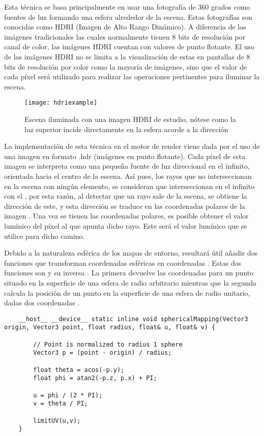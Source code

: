 Esta técnica se basa principalmente en usar una fotografía de 360 grados como fuentes de luz formando una esfera alrededor de la escena. Estas fotografías son conocidas como HDRI (Imagen de Alto Rango Dinámico). A diferencia de las imágenes tradicionales las cuales normalmente tienen 8 bits de resolución por canal de color, las imágenes HDRI cuentan con valores de punto flotante. El uso de las imágenes HDRI no se limita a la visualización de estas en pantallas de 8 bits de resolución por color como la mayoría de imágenes, sino que el valor de cada píxel será utilizado para realizar las operaciones pertinentes para iluminar la escena.

		
\begin{figure}[H]
    \centering
	\texttt{[image: hdriexample]}
	\caption{Escena iluminada con una imagen HDRI de estudio, nótese como la luz superior incide directamente en la esfera acorde a la dirección}
	\label{fig:hdriexample}
\end{figure}

La implementación de esta técnica en el motor de render viene dada por el uso de una imagen en formato .hdr (imágenes en punto flotante). Cada píxel de esta imagen se interpreta como una pequeña fuente de luz direccional en el infinito, orientada hacia el centro de la escena. Así pues, los rayos que no interseccionan en la escena con ningún elemento, se consideran que interseccionan en el infinito con el , por esta razón, al detectar que un rayo sale de la escena, se obtiene la dirección de este, y esta dirección se traduce en las coordenadas polares de la imagen . Una vez se tienen las coordenadas polares, es posible obtener el valor lumínico del píxel al que apunta dicho rayo. Este será el valor lumínico que se utilice para dicho camino.
	
	
	
	
Debido a la naturaleza esférica de los mapas de entorno, resultará útil añadir dos funciones que transforman coordenadas esféricas en coordenadas . Estas dos funciones son  y su inversa . La primera devuelve las coordenadas  para un punto situado en la superficie de una esfera de radio arbitrario mientras que la segunda calcula la posición de un punto en la superficie de una esfera de radio unitario, dadas dos coordenadas .

	\label{sphericalmapping}
	\begin{lstlisting}
    __host__ __device__ static inline void sphericalMapping(Vector3 origin, Vector3 point, float radius, float& u, float& v) {

        // Point is normalized to radius 1 sphere
        Vector3 p = (point - origin) / radius;

        float theta = acos(-p.y);
        float phi = atan2(-p.z, p.x) + PI;

        u = phi / (2 * PI);
        v = theta / PI;

        limitUV(u,v);
    }
	
	\end{lstlisting}
	
